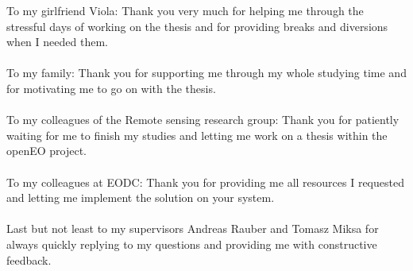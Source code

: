 \documentclass[draft,final]{vutinfth} %
\begin{document}
\frontmatter %

\addstatementpage




\begin{acknowledgements*}
To my girlfriend Viola: Thank you very much for helping me through the stressful days of working on the thesis and for providing breaks and diversions when I needed them.\\ \\
To my family: Thank you for supporting me through my whole studying time and for motivating me to go on with the thesis. \\ \\
To my colleagues of the Remote sensing research group: Thank you for patiently waiting for me to finish my studies and letting me work on a thesis within the openEO project. \\ \\
To my colleagues at EODC: Thank you for providing me all resources I requested and letting me implement the solution on your system. \\ \\
Last but not least to my supervisors Andreas Rauber and Tomasz Miksa for always quickly replying to my questions and providing me with constructive feedback. 
\end{acknowledgements*}
\end{document}
